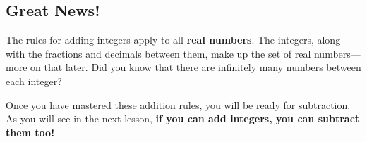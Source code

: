 \documentclass{ximera}[font=12pt]
\begin{document}
\subsection*{Great News!}

The rules for adding integers apply to all \textbf{real numbers}. The integers, along with the fractions and decimals between them, make up the set of
real numbers—more on that later.  Did you know that there are infinitely many numbers between each integer?

Once you have mastered these addition rules, you will be ready for subtraction. As you will see in the next lesson,
\textbf{if you can add integers, you can subtract them too!}
\end{document}
